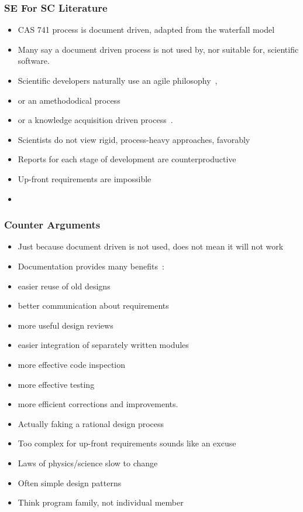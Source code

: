 \documentclass[t,12pt,numbers,fleqn]{beamer}
\begin{document}
\begin{frame}
\frametitle{SE For SC Literature}

\begin {itemize}

\item CAS 741 process is document driven, adapted
from the waterfall model~\cite{GhezziEtAl2003, VanVliet2000}
\item Many say a document driven process is not used by, nor suitable for,
scientific software.
\bi
\item Scientific developers naturally use an agile
  philosophy~\cite{AckroydEtAl2008, CarverEtAl2007, EasterbrookAndJohns2009, Segal2005}, 
\item or an amethododical process~\cite{Kelly2013}
\item or a knowledge acquisition driven process~\cite{Kelly2015}.
\ei
\item Scientists do not view rigid, process-heavy approaches,
  favorably~\cite{CarverEtAl2007}
\item Reports for each stage of development are counterproductive~\cite[p.~373]{Roache1998}
\item Up-front requirements are
impossible~\cite{CarverEtAl2007, SegalAndMorris2008}
\item {}
\end{itemize}

\end{frame}


\begin{frame}
\frametitle{Counter Arguments}

\begin {itemize}

\item Just because document driven is not used, does not mean it will not work
\item Documentation provides many
benefits~\cite{Parnas2010}: 
\bi
\item easier reuse of old designs
\item better communication about requirements
\item more useful design reviews
\item easier integration of separately
written modules
\item more effective code inspection
\item more effective testing
\item more efficient corrections and improvements.
\ei
\item Actually faking a rational design process
\item Too complex for up-front requirements sounds like an excuse
\bi
\item Laws of physics/science slow to change
\item Often simple design patterns
\item Think program family, not individual member
\ei
\end{itemize}

\end{frame}
\end{document}
